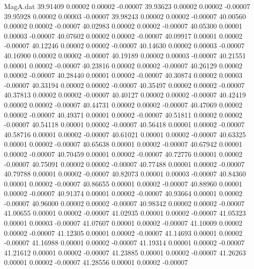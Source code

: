 \begin{filecontents}{MagA.dat}
  39.91409    0.00002    0.00002   -0.00007
  39.93623    0.00002    0.00002   -0.00007
  39.95928    0.00002    0.00003   -0.00007
  39.98243    0.00002    0.00002   -0.00007
  40.00560    0.00002    0.00002   -0.00007
  40.02983    0.00002    0.00002   -0.00007
  40.05300    0.00001    0.00003   -0.00007
  40.07602    0.00002    0.00002   -0.00007
  40.09917    0.00001    0.00002   -0.00007
  40.12246    0.00002    0.00002   -0.00007
  40.14630    0.00002    0.00003   -0.00007
  40.16900    0.00002    0.00002   -0.00007
  40.19189    0.00002    0.00003   -0.00007
  40.21551    0.00001    0.00002   -0.00007
  40.23816    0.00002    0.00002   -0.00007
  40.26129    0.00002    0.00002   -0.00007
  40.28440    0.00001    0.00002   -0.00007
  40.30874    0.00002    0.00003   -0.00007
  40.33194    0.00002    0.00002   -0.00007
  40.35497    0.00002    0.00002   -0.00007
  40.37813    0.00002    0.00002   -0.00007
  40.40127    0.00002    0.00002   -0.00007
  40.42419    0.00002    0.00002   -0.00007
  40.44731    0.00002    0.00002   -0.00007
  40.47069    0.00002    0.00002   -0.00007
  40.49371    0.00001    0.00002   -0.00007
  40.51811    0.00002    0.00002   -0.00007
  40.54118    0.00001    0.00002   -0.00007
  40.56418    0.00001    0.00002   -0.00007
  40.58716    0.00001    0.00002   -0.00007
  40.61021    0.00001    0.00002   -0.00007
  40.63325    0.00001    0.00002   -0.00007
  40.65638    0.00001    0.00002   -0.00007
  40.67942    0.00001    0.00002   -0.00007
  40.70459    0.00001    0.00002   -0.00007
  40.72776    0.00001    0.00002   -0.00007
  40.75091    0.00002    0.00002   -0.00007
  40.77488    0.00001    0.00002   -0.00007
  40.79788    0.00001    0.00002   -0.00007
  40.82073    0.00001    0.00003   -0.00007
  40.84360    0.00001    0.00002   -0.00007
  40.86655    0.00001    0.00002   -0.00007
  40.88960    0.00001    0.00002   -0.00007
  40.91374    0.00001    0.00002   -0.00007
  40.93664    0.00001    0.00002   -0.00007
  40.96000    0.00002    0.00002   -0.00007
  40.98342    0.00002    0.00002   -0.00007
  41.00655    0.00001    0.00002   -0.00007
  41.02935    0.00001    0.00002   -0.00007
  41.05323    0.00001    0.00003   -0.00007
  41.07607    0.00001    0.00002   -0.00007
  41.10009    0.00002    0.00002   -0.00007
  41.12305    0.00001    0.00002   -0.00007
  41.14693    0.00001    0.00002   -0.00007
  41.16988    0.00001    0.00002   -0.00007
  41.19314    0.00001    0.00002   -0.00007
  41.21612    0.00001    0.00002   -0.00007
  41.23885    0.00001    0.00002   -0.00007
  41.26263    0.00001    0.00002   -0.00007
  41.28556    0.00001    0.00002   -0.00007

\end{filecontents}
